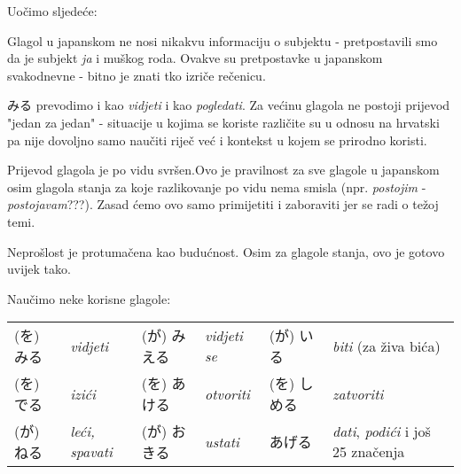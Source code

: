 	\begin{reibun}
	\end{reibun}
	
	Uočimo sljedeće:
	\begin{hyou}
		\item Glagol u japanskom ne nosi nikakvu informaciju o subjektu - pretpostavili smo da je subjekt \textit{ja} i muškog roda. Ovakve su pretpostavke u japanskom svakodnevne - bitno je znati tko izriče rečenicu.
		\item みる prevodimo i kao \textit{vidjeti} i kao \textit{pogledati}. Za većinu glagola ne postoji prijevod "jedan za jedan" - situacije u kojima se koriste različite su u odnosu na hrvatski pa nije dovoljno samo naučiti riječ već i kontekst u kojem se prirodno koristi.
		\item Prijevod glagola je po vidu svršen.\footnotemark[1] Ovo je pravilnost za sve glagole u japanskom osim glagola stanja za koje razlikovanje po vidu nema smisla (npr. \textit{postojim} - \textit{postojavam}???). Zasad ćemo ovo samo primijetiti i zaboraviti jer se radi o težoj temi.
		\item Neprošlost je protumačena kao budućnost. Osim za glagole stanja, ovo je gotovo uvijek tako.
	\end{hyou}
	
	
	Naučimo neke korisne glagole:
	
	\vspace{10pt}
	\begin{tabular}{l l l l l l}
		(を) みる & \textit{vidjeti} & (が) みえる & \textit{vidjeti se} & (が) いる & \textit{biti} (za živa bića)\\
		(を) でる & \textit{izići} & (を) あける & \textit{otvoriti} & (を) しめる & \textit{zatvoriti}\\
		(が) ねる & \textit{leći, spavati} & (が) おきる & \textit{ustati} & あげる & \textit{dati}, \textit{podići} i još 25 značenja\\
	\end{tabular}

	\newpage
	
